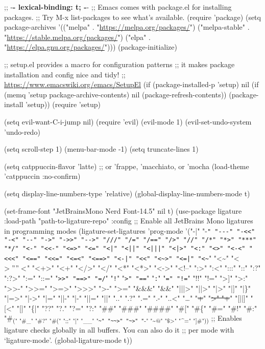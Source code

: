\documentclass[11pt]{article}
\date{\today}
\title{}
\begin{document}
\tableofcontents

;; -\textbf{- lexical-binding: t; -}-
;; Emacs comes with package.el for installing packages.
;; Try M-x list-packages to see what's available.
(require 'package)
(setq package-archives '(("melpa" . "\url{https://melpa.org/packages/}")
                         ("melpa-stable" . "\url{https://stable.melpa.org/packages/}")
                         ("elpa" . "\url{https://elpa.gnu.org/packages/}")))
(package-initialize)

;; setup.el provides a macro for configuration patterns
;; it makes package installation and config nice and tidy!
;; \url{https://www.emacswiki.org/emacs/SetupEl}
(if (package-installed-p 'setup)
    nil
  (if (memq 'setup package-archive-contents)
      nil
    (package-refresh-contents))
  (package-install 'setup))
(require 'setup)


(setq evil-want-C-i-jump nil)
(require 'evil)
(evil-mode 1)
(evil-set-undo-system 'undo-redo)

(setq scroll-step 1)
(menu-bar-mode -1)
(setq truncate-lines 1)

(setq catppuccin-flavor 'latte) ;; or 'frappe, 'macchiato, or 'mocha
(load-theme 'catppuccin :no-confirm)

(setq display-line-numbers-type 'relative)
(global-display-line-numbers-mode t)

(set-frame-font "JetBrainsMono Nerd Font-14.5" nil t)
(use-package ligature
  :load-path "path-to-ligature-repo"
  :config
  ;; Enable all JetBrains Mono ligatures in programming modes
  (ligature-set-ligatures 'prog-mode '("-|" "-\texttt{" "-{}-{}-" "-<{}<{}" "-<" "-{}-{}" "->" "->{}>{}" "-{}-{}>" "///" "/=" "/=="
                                      "/>" "//" "/*" "*>" "***" "*/" "<-" "<{}<{}-" "<=>" "<=" "<|" "<||"
                                      "<|||" "<|>" "<:" "<>" "<-<" "<{}<{}<" "<==" "<{}<{}=" "<=<" "<==>" "<-|"
                                      "<{}<{}" "<\textasciitilde{}>" "<=|" "<\textasciitilde{}}" "<\textasciitilde{}" "<\(>" "<\)" "<+>" "<+" "</>" "</" "<*"
                                      "<*>" "<->" "<!--" ":>" ":<" ":::" "::" ":?" ":?>" ":=" "::=" "\texttt{>{}>{}"
                                      "==>" "=/}" "\texttt{!}" "\texttt{>" "==}" "\texttt{:}" "\texttt{=" "!=}" "!!" "!=" ">]" ">:"
                                      ">>-" ">>=" ">=>" ">>>" ">-" ">=" "\&\&\&" "\&\&" "|||>" "||>" "|>" "|]"
                                      "|\}" "|=>" "|->" "|=" "||-" "|-" "||=" "||" ".." ".?" ".=" ".-" "..<"
                                      "\ldots{}" "\sout{+}" "\sout{>" "+}" "[||]" "[<" "[|" "\{|" "??" "?." "?=" "?:" "\#\#"
                                      "\#\#\#" "\#\#\#\#" "\#[" "\#\{" "\#=" "\#!" "\#:" "\#\textsubscript{(" "\#\_" "\#?" "\#(" ";;" "\uline{|}"
                                      "\_\_" "\texttt{\textasciitilde{}" "\textasciitilde{}\textasciitilde{}>" "\textasciitilde{}>" "}-" "\textasciitilde{}@" "\$>" "\^{}=" "]\#"))}
  ;; Enables ligature checks globally in all buffers. You can also do it
  ;; per mode with `ligature-mode'.
  (global-ligature-mode t))
\end{document}

